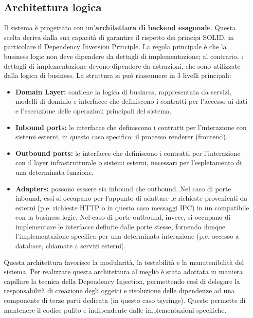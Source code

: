 \subsection{Architettura logica}
Il sistema è progettato con un'\textbf{architettura di backend esagonale}. Questa scelta deriva dalla sua capacità di garantire il rispetto dei principi SOLID, in particolare il Dependency Inversion Principle.
La regola principale è che la business logic non deve dipendere da dettagli di implementazione; al contrario, i dettagli di implementazione devono dipendere da astrazioni, che sono utilizzate dalla logica di business.
La struttura si può riassumere in 3 livelli principali:
\begin{itemize}
    \item \textbf{Domain Layer:} contiene la logica di business, rappresentata da servizi, modelli di dominio e interfacce che definiscono i contratti per l'accesso ai dati e l'esecuzione delle operazioni principali del sistema.
    \item \textbf{Inbound ports:} le interfacce che definiscono i contratti per l'interazione con sistemi esterni, in questo caso specifico: il processo renderer (frontend).
    \item \textbf{Outbound ports:} le interfacce che definiscono i contratti per l'interazione con il layer infrastrutturale o sistemi esterni, necessari per l'espletamento di una determinata funzione.
    \item \textbf{Adapters:} possono esssere sia inbound che outbound. Nel caso di porte inbound, essi si occupano per l'appunto di adattare le richieste provenienti da esterni (p.e. richieste HTTP o in questo caso messaggi IPC) in un  compatibile con la business logic. Nel caso di porte outbound, invece, si occupano di implementare le interfacce definite dalle porte stesse, fornendo dunque l'implementazione specifica per una determinata interazione (p.e. accesso a database, chiamate a servizi esterni).
\end{itemize}
Questa architettura favorisce la modularità, la testabilità e la manutenibilità del sistema. Per realizzare questa architettura al meglio è stata adottata in maniera capillare la tecnica della Dependency Injection, permettendo così di delegare la responsabilità di creazione degli oggetti e risoluzione delle dipendenze ad una componente di terze parti dedicata (in questo caso tsyringe). Questo permette di mantenere il codice pulito e indipendente dalle implementazioni specifiche.

